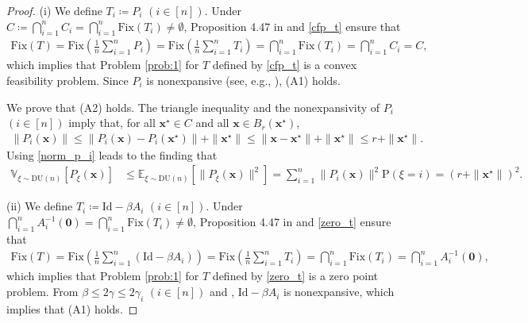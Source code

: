 \documentclass[smallextended,referee,envcountsect,]{svjour3}
\begin{document}
\begin{proof}
(i) We define $T_i \coloneqq P_i$ $(i\in [n])$. Under $C \coloneqq \bigcap_{i=1}^n C_i = \bigcap_{i=1}^n\mathrm{Fix}(T_i) \neq \emptyset$, Proposition 4.47 in \cite{b-c} and \eqref{cfp_t} ensure that 
\begin{align*}
\mathrm{Fix}(T) 
= \mathrm{Fix} \left( \frac{1}{n} \sum_{i=1}^n P_i  \right)
= \mathrm{Fix} \left( \frac{1}{n} \sum_{i=1}^n T_i  \right)
= \bigcap_{i=1}^n \mathrm{Fix}(T_i)
= \bigcap_{i=1}^n C_i = C,
\end{align*}
which implies that Problem \ref{prob:1} for $T$ defined by \eqref{cfp_t} is a convex feasibility problem. Since $P_i$ is nonexpansive (see, e.g., \cite[Theorem 3.1.4]{takahashi}), (A1) holds.

We prove that (A2) holds. The triangle inequality and the nonexpansivity of $P_i$ $(i\in [n])$ imply that, for all $\bm{x}^\star \in C$ and all $\bm{x} \in B_{r} (\bm{x}^\star)$,
\begin{align}\label{norm_p_i}
\|P_i (\bm{x})\| 
\leq 
\| P_i (\bm{x}) - P_i (\bm{x}^\star)  \| + \|\bm{x}^\star\|
\leq \|\bm{x} - \bm{x}^\star\| + \|\bm{x}^\star\| \leq r + \|\bm{x}^\star\|.
\end{align}
Using \eqref{norm_p_i} leads to the finding that 
\begin{align*}
\mathbb{V}_{\xi \sim \mathrm{DU}(n)}[P_\xi (\bm{x})]
&\leq 
\mathbb{E}_{\xi \sim \mathrm{DU}(n)} \left[\| P_\xi (\bm{x})\|^2 \right]
= 
\sum_{i=1}^n \|P_i (\bm{x})\|^2 \mathrm{P}(\xi = i)
=  
\left( r + \|\bm{x}^\star\| \right)^{2}.
\end{align*}

(ii) We define $T_i \coloneqq \mathrm{Id} - \beta A_i$ $(i\in [n])$. Under $\bigcap_{i=1}^n A_i^{-1}(\bm{0}) = \bigcap_{i=1}^n\mathrm{Fix}(T_i) \neq \emptyset$, Proposition 4.47 in \cite{b-c} and \eqref{zero_t} ensure that 
\begin{align*}
\mathrm{Fix}(T) 
= \mathrm{Fix} \left( \frac{1}{n} \sum_{i=1}^n (\mathrm{Id} - \beta A_i)  \right)
= \mathrm{Fix} \left( \frac{1}{n} \sum_{i=1}^n T_i  \right)
= \bigcap_{i=1}^n \mathrm{Fix}(T_i)
= \bigcap_{i=1}^n A_i^{-1}(\bm{0}),
\end{align*}
which implies that Problem \ref{prob:1} for $T$ defined by \eqref{zero_t} is a zero point problem. From $\beta \leq 2 \gamma \leq 2 \gamma_i$ $(i\in [n])$ and \cite[Proposition 2.3]{iiduka_JOTA}, $\mathrm{Id} - \beta A_i$ is nonexpansive, which implies that (A1) holds.


\end{proof}
\end{document}
